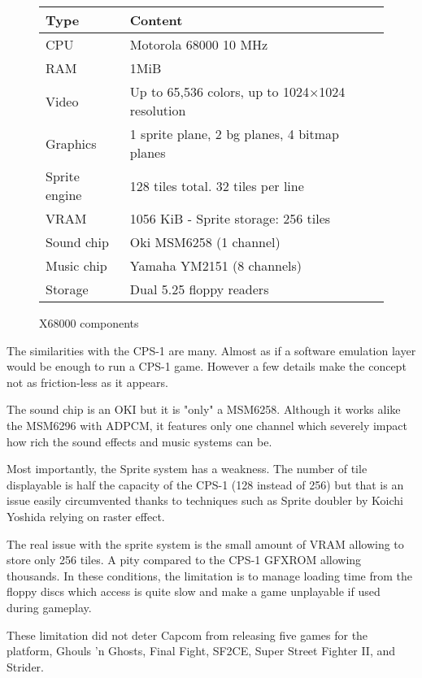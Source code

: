  \begin{figure}[H]
\begin{tabularx}{\textwidth}{lX}
  \toprule    
  \textbf{Type } & \textbf{ Content } \\  
  \toprule   
    
CPU & Motorola 68000 10 MHz \\  
RAM & 1MiB \\ 
Video  & Up to 65,536 colors, up to 1024×1024 resolution \\
Graphics & 1 sprite plane, 2 bg planes, 4 bitmap planes\\
Sprite engine & 128 tiles total. 32 tiles per line\\
VRAM & 1056 KiB - Sprite storage: 256 tiles\\
Sound chip & Oki MSM6258 (1 channel)  \\ 
Music chip & Yamaha YM2151 (8 channels)  \\ 
Storage & Dual 5.25 floppy readers  \\ 
  \toprule   
\end{tabularx}
\caption*{X68000 components}
\end{figure}

The similarities with the CPS-1 are many. Almost as if a software emulation layer would be enough to run a CPS-1 game. However a few details make the concept not as friction-less as it appears.

The sound chip is an OKI but it is "only" a MSM6258. Although it works alike the MSM6296 with ADPCM, it features only one channel which severely impact how rich the sound effects and music systems can be.

Most importantly, the Sprite system has a weakness. The number of tile displayable is half the capacity of the CPS-1 (128 instead of 256) but that is an issue easily circumvented thanks to techniques such as Sprite doubler by Koichi Yoshida\cite{x68000spritedoubler} relying on raster effect.

The real issue with the sprite system is the small amount of VRAM allowing to store only 256 tiles. A pity compared to the CPS-1 GFXROM allowing thousands. In these conditions, the limitation is to manage loading time from the floppy discs which access is quite slow and make a game unplayable if used during gameplay.

\pagebreak

These limitation did not deter Capcom from releasing five games for the platform, Ghouls 'n Ghosts, Final Fight, SF2CE, Super Street Fighter II, and Strider. 

